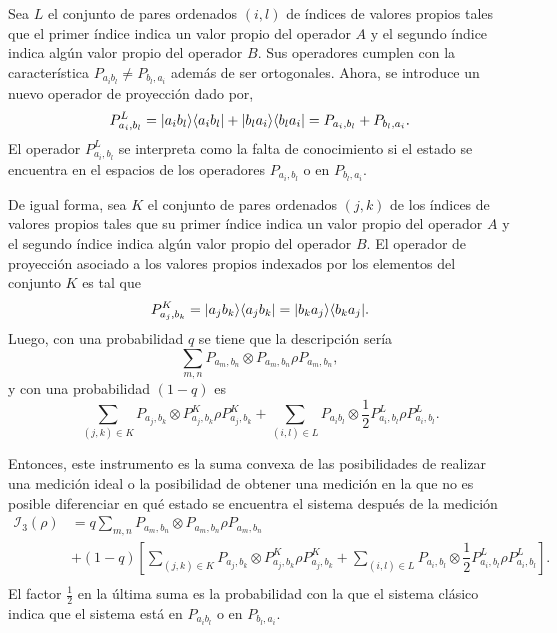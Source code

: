     Sea $L$ el conjunto de pares ordenados $(i,l)$ de índices de  valores propios tales que el primer índice indica un valor propio del operador $A$ y el segundo índice indica algún valor propio del operador $B$. Sus operadores  cumplen con la característica $P_{a_i b_l}\ne P_{b_l, a_i}$ además de ser ortogonales. Ahora, se introduce un nuevo operador de proyección dado por,  \[P^{L}_{a_i,b_l}=|a_i b_l\rangle \langle a_i b_l|+|b_l a_i\rangle \langle b_l a_i|=P_{a_i,b_l}+P_{b_l,a_i}.\]El operador $P^L_{a_i,b_l}$ se interpreta como la falta de conocimiento si el estado se encuentra en el espacios de los operadores $P_{a_i,b_l}$ o en $P_{b_l, a_i}$. 

    De igual forma, sea $K$ el conjunto de pares ordenados $(j,k)$ de los índices de valores propios tales que su primer índice indica un valor propio del operador $A$ y el segundo índice indica algún valor propio del operador $B$.  El operador de proyección asociado a los valores propios indexados por los elementos del conjunto $K$ es tal que \[P^{K}_{a_j,b_k}=|a_j b_k\rangle \langle a_j b_k|=|b_k a_j \rangle \langle b_k a_j |.\] Luego, con una probabilidad $q$ se tiene que la descripción sería \[\sum_{m,n} P_{a_m,b_n}\otimes P_{a_m,b_n}\rho P_{a_m,b_n},\] y con una probabilidad $(1-q)$ es \[\sum_{(j,k)\in K} P_{a_j, b_k}\otimes  P^{K}_{a_j,b_k}\rho P^K_{a_j,b_k}+\sum_{(i,l) \in L}P_{a_i b_l} \otimes  \dfrac{1}{2}P^{L}_{a_i,b_l}\rho P^L_{a_i,b_l}.\]

     Entonces, este instrumento es la suma convexa de las posibilidades de realizar una medición ideal o la posibilidad de obtener una medición en la que no es posible diferenciar en qué estado se encuentra el sistema después de la medición\begin{equation}
        \begin{split}
            \mathcal{I}_3(\rho)&=q\sum_{m,n}  P_{a_m,b_n}\otimes P_{a_m,b_n}\rho P_{a_m,b_n}\\
            &+(1-q)\left[\sum_{(j,k)\in K}P_{a_j,b_k} \otimes P^{K}_{a_j,b_k}\rho P^{K}_{a_j,b_k}+\sum_{(i,l) \in L}P_{a_i,b_l} \otimes  \dfrac{1}{2}P^{L}_{a_i,b_l}\rho P^L_{a_i,b_l}\right].\\
        \end{split}
    \end{equation}El factor $\frac{1}{2}$ en la última suma es la probabilidad con la que el sistema clásico indica que el sistema está en $P_{a_i b_l}$ o en $P_{b_l,a_i}$. 
    













